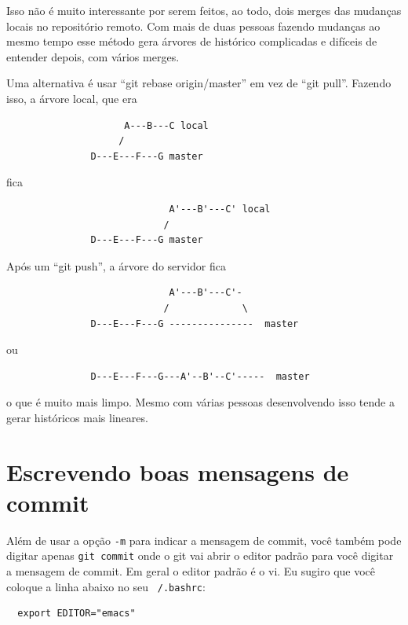 \documentclass[12pt,brazil]{book}
\begin{document}
Isso não é muito interessante por serem feitos, ao todo, dois merges
das mudanças locais no repositório remoto. Com mais de duas pessoas
fazendo mudanças ao mesmo tempo esse método gera árvores de histórico
complicadas e difíceis de entender depois, com vários merges.

Uma alternativa é usar ``git rebase origin/master'' em vez de ``git
pull''. Fazendo isso, a árvore local, que era

\begin{verbatim}
                     A---B---C local
                    /
               D---E---F---G master
\end{verbatim}

fica

\begin{verbatim}
                             A'---B'---C' local
                            /
               D---E---F---G master
\end{verbatim}

Após um ``git push'', a árvore do servidor fica

\begin{verbatim}
                             A'---B'---C'-
                            /             \
               D---E---F---G ---------------  master
\end{verbatim}

ou

\begin{verbatim}
               D---E---F---G---A'--B'--C'-----  master
\end{verbatim}

o que é muito mais limpo. Mesmo com várias pessoas desenvolvendo isso
tende a gerar históricos mais lineares.

\section{Escrevendo boas mensagens de commit}
\label{sec:escr-boas-mens}

Além de usar a opção \texttt{-m} para indicar a mensagem de commit,
você também pode digitar apenas \texttt{git commit} onde o git vai
abrir o editor padrão para você digitar a mensagem de commit. Em geral
o editor padrão é o vi. Eu sugiro que você coloque a linha abaixo no
seu \texttt{~/.bashrc}:

\begin{verbatim}
  export EDITOR="emacs"
\end{verbatim}
\end{document}
